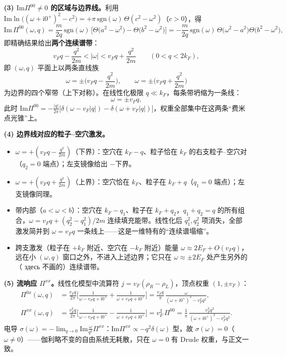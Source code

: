 \textbf{(3) $\mathrm{Im}\Pi^{00}\neq0$ 的区域与边界线。}利用 $\mathrm{Im}\ln\big((\omega+\mathrm{i}0^+)^2-c^2\big)=+\pi\,\mathrm{sgn}(\omega)\,\Theta(c^2-\omega^2)$（$c>0$），得
\begin{equation*}
\mathrm{Im}\,\Pi^{00}(\omega,q)
=\frac{m}{2q}\,\mathrm{sgn}(\omega)\,
\Big[\Theta\big(a^2-\omega^2\big)-\Theta\big(b^2-\omega^2\big)\Big]
=-\frac{m}{2q}\,\mathrm{sgn}(\omega)\,\Theta\big(\omega^2-a^2\big)\Theta\big(b^2-\omega^2\big),
\end{equation*}
即精确结果给出\textbf{两个连续谱带}：
\begin{equation*}
v_Fq-\frac{q^2}{2m}<|\omega|<v_Fq+\frac{q^2}{2m}\qquad(0<q<2k_F),
\end{equation*}
即 $(\omega,q)$ 平面上以两条直线族
\begin{equation*}
\boxed{\;\omega=\pm\Big(v_Fq-\frac{q^2}{2m}\Big),\qquad
\omega=\pm\Big(v_Fq+\frac{q^2}{2m}\Big)\;}
\end{equation*}
为边界的四个窄带（上下对称）。在线性化极限 $q\ll k_F$，每条带坍缩为一条线：
\begin{equation*}
\omega=\pm v_Fq ,
\end{equation*}
此时 $\mathrm{Im}\Pi^{00}=-\frac{|q|}{2\pi}\big[\delta(\omega-v_F|q|)-\delta(\omega+v_F|q|)\big]$，权重全部集中在这两条“费米点光锥”上。

\textbf{(4) 边界线对应的粒子--空穴激发。}
\begin{itemize}
\item $\omega=+(v_Fq-\frac{q^2}{2m})$（下界）：空穴在 $k_F-q$、粒子恰在 $k_F$ 的右支粒子--空穴对（$q_2=0$ 端点）；左支镜像给出 $-下界$。
\item $\omega=+(v_Fq+\frac{q^2}{2m})$（上界）：空穴恰在 $k_F$、粒子在 $k_F+q$（$q_1=0$ 端点）；左支镜像同理。
\item 带内部（$a<\omega<b$）：空穴在 $k_F-q_1$、粒子在 $k_F+q_2$，$q_1+q_2=q$ 的所有组合，$\omega=v_Fq+(q_2^2-q_1^2)/2m$ 连续填充能带。线性化后 $q_1^2,q_2^2$ 项消失，全部激发简并到 $\omega=v_Fq$ 一条线上——这是一维特有的“连续谱塌缩”。
\item 跨支激发（粒子在 $+k_F$ 附近、空穴在 $-k_F$ 附近）能量 $\omega\approx2E_F+O(v_Fq)$，远在小 $(\omega,q)$ 窗口之外，不进入上述边界；它只在 $\omega\approx\pm2E_F$ 处产生另外的（ здесь 不画的）连续谱带。
\end{itemize}

\textbf{(5) 流响应 $\Pi^{xx}$。}线性化模型中流算符 $j=v_F(\rho_R-\rho_L)$，顶点权重 $(1,\pm v_F)$：
\begin{align*}
\Pi^{0x}(\omega,q)&=\frac{v_Fq}{2\pi}\Big[\frac{1}{\omega-v_Fq+\mathrm{i}0^+}+\frac{1}{\omega+v_Fq+\mathrm{i}0^+}\Big]
=\frac{v_Fq}{\pi}\,\frac{\omega}{(\omega+\mathrm{i}0^+)^2-v_F^2q^2},\\
\Pi^{xx}(\omega,q)&=\frac{v_F^2q}{2\pi}\Big[\frac{1}{\omega-v_Fq+\mathrm{i}0^+}-\frac{1}{\omega+v_Fq+\mathrm{i}0^+}\Big]
=v_F^2\,\Pi^{00}
=\frac{1}{\pi}\,\frac{v_F^3q^2}{(\omega+\mathrm{i}0^+)^2-v_F^2q^2}.
\end{align*}
电导 $\sigma(\omega)=-\lim_{q\to0}\mathrm{Im}\frac{\omega}{q^2}\Pi^{xx}$：$\mathrm{Im}\Pi^{xx}\propto-q^2\delta(\omega)$ 型，故 $\sigma(\omega)=0$（$\omega\neq0$）——伽利略不变的自由系统无耗散，只在 $\omega=0$ 有 Drude 权重，与正文一致。

